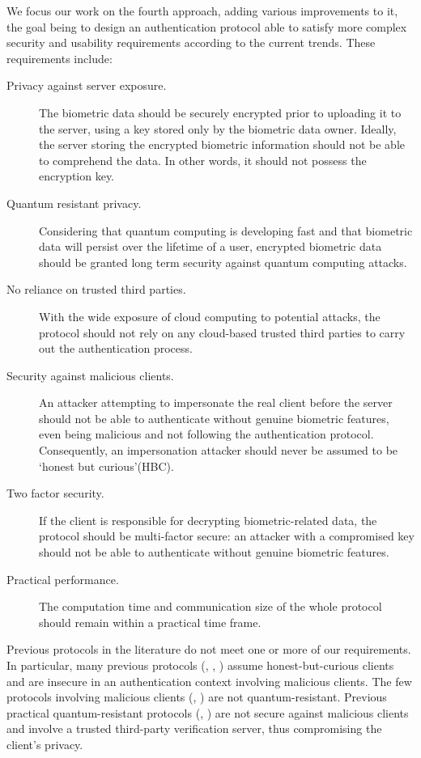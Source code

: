   We focus our work on the fourth approach, adding various improvements to it, the goal
  being to design an authentication protocol able to satisfy more complex security and
  usability requirements according to the current trends. These requirements include:
\begin{description}
\item [Privacy against server exposure.] The biometric data should be securely
  encrypted prior to uploading it to the server, using a key stored only by the
  biometric data owner. Ideally, the server storing the encrypted biometric information should
  not be able to comprehend the data. In other words, it should not possess the
  encryption key.

\item [Quantum resistant privacy. ] Considering that quantum computing is developing
  fast and that biometric data will persist over the lifetime of a user,
  encrypted biometric data should be granted long term security against quantum
  computing attacks.
\item [No reliance on trusted third parties. ] With the wide exposure of cloud
  computing to potential attacks, the protocol should not rely on any
  cloud-based trusted third parties to carry out the authentication process.
\item [Security against malicious clients.] An attacker attempting to impersonate
  the real client before the server should not be able to authenticate without
  genuine biometric features, even being malicious and not following the
  authentication protocol. Consequently, an impersonation attacker should never be assumed to
  be `honest but curious'(HBC).
\item [Two factor security.] If the client is responsible for decrypting
  biometric-related data, the protocol should be multi-factor secure: an
  attacker with a compromised key should not be able to authenticate without
  genuine biometric features.
\item [Practical performance.] The computation time and communication size of
  the whole protocol should remain within a practical time frame.
\end{description}
Previous protocols in the literature do not meet one or more of our
requirements. In particular, many previous protocols
(\cite{bringer2007application}, \cite{erkin2009privacy},
\cite{osadchy2010scifi}) assume honest-but-curious clients and are insecure in
an authentication context involving malicious clients. The few protocols
involving malicious clients (\cite{shahandashti2012private},
\cite{vsedvenka2015secure}) are not quantum-resistant. Previous practical
quantum-resistant protocols (\cite{yasuda2014practical},
\cite{mandal2015comprehensive}) are not secure against malicious clients and
involve a trusted third-party verification server, thus compromising the
client's privacy.

